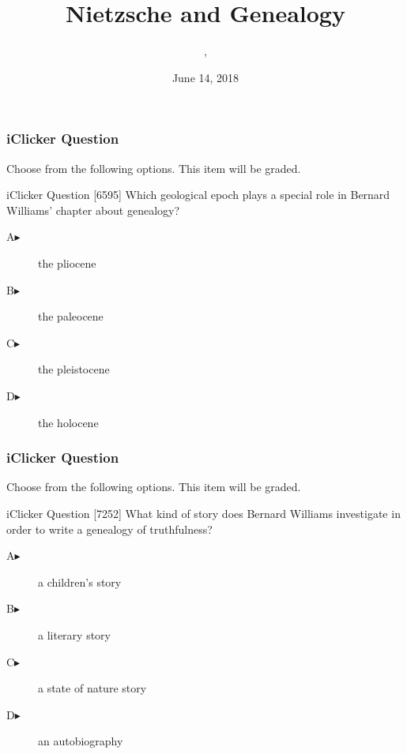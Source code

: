 \documentclass[xcolor=dvipsnames]{beamer}
\title{Nietzsche and Genealogy}
\subtitle{{\CourseNumber}, {\CourseInst}}
\author{\CourseName}
\date{June 14, 2018}
\begin{document}
\begin{frame}
  \titlepage
\end{frame}

\begin{frame}
  \frametitle{iClicker Question}
Choose from the following options. This item will be graded.
\begin{block}{iClicker Question}
[6595] Which geological epoch plays a special role in Bernard Williams' chapter about genealogy?
\end{block}
\begin{description}
\item[A\hspace{.2in}$\blacktriangleright$] the pliocene
\item[B\hspace{.2in}$\blacktriangleright$] the paleocene
\item[C\hspace{.2in}$\blacktriangleright$] the pleistocene
\item[D\hspace{.2in}$\blacktriangleright$] the holocene
\end{description}
\end{frame}

\begin{frame}
  \frametitle{iClicker Question}
Choose from the following options. This item will be graded.
\begin{block}{iClicker Question}
[7252] What kind of story does Bernard Williams investigate in order to write a genealogy of truthfulness?
\end{block}
\begin{description}
\item[A\hspace{.2in}$\blacktriangleright$] a children's story
\item[B\hspace{.2in}$\blacktriangleright$] a literary story
\item[C\hspace{.2in}$\blacktriangleright$] a state of nature story
\item[D\hspace{.2in}$\blacktriangleright$] an autobiography
\end{description}
\end{frame}
\end{document}
